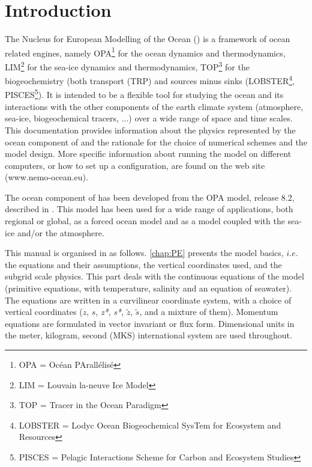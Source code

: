 \documentclass[../tex_main/NEMO_manual]{subfiles}
\begin{document}

\chapter{Introduction}

The Nucleus for European Modelling of the Ocean (\NEMO) is a framework of ocean 
related engines, namely OPA\footnote{OPA = Oc\'{e}an PArall\'{e}lis\'{e}} for the 
ocean dynamics and thermodynamics, LIM\footnote{LIM = Louvain la-neuve Ice 
Model} for the sea-ice dynamics and thermodynamics, TOP\footnote{TOP = Tracer 
in the Ocean Paradigm} for the biogeochemistry (both transport (TRP) and sources 
minus sinks (LOBSTER\footnote{LOBSTER = Lodyc Ocean Biogeochemical SysTem for 
Ecosystem and Resources}, PISCES\footnote{PISCES = Pelagic Interactions Scheme for 
Carbon and Ecosystem Studies}). It is intended to be a flexible tool for studying 
the ocean and its interactions with the other components of the earth climate system 
(atmosphere, sea-ice, biogeochemical tracers, ...) over a wide range of space and time scales. 
This documentation provides information about the physics represented by the ocean 
component of \NEMO and the rationale for the choice of numerical schemes and 
the model design. More specific information about running the model on different 
computers, or how to set up a configuration, are found on the \NEMO web site 
(www.nemo-ocean.eu). 

The ocean component of \NEMO has been developed from the OPA model, 
release 8.2, described in \citet{Madec1998}. This model has been used for a wide 
range of applications, both regional or global, as a forced ocean model and as a 
model coupled with the sea-ice and/or the atmosphere.  

This manual is organised in as follows. \autoref{chap:PE} presents the model basics, 
$i.e.$ the equations and their assumptions, the vertical coordinates used, and the 
subgrid scale physics. This part deals with the continuous equations of the model 
(primitive equations, with temperature, salinity and an equation of seawater). 
The equations are written in a curvilinear coordinate system, with a choice of vertical 
coordinates ($z$, $s$, \textit{z*}, \textit{s*}, $\tilde{z}$, $\tilde{s}$, and a mixture of them). 
Momentum equations are formulated in vector invariant or flux form. 
Dimensional units in the meter, kilogram, second (MKS) international system 
are used throughout.
\end{document}
